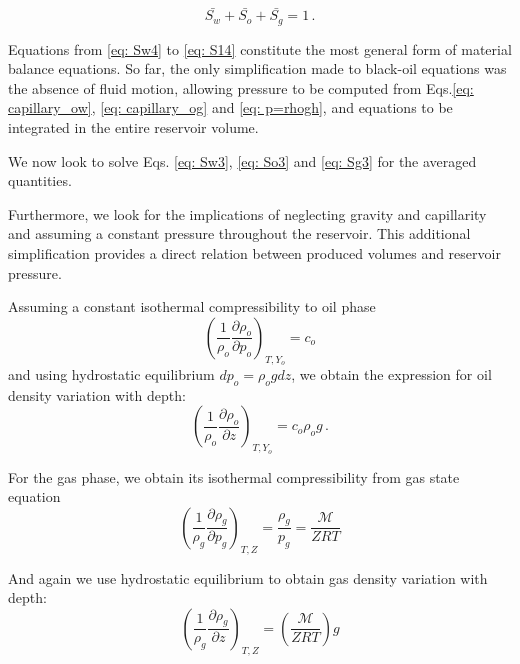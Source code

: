 \documentclass[authoryear,preprint,review,12pt]{elsarticle}
\begin{document}
\begin{equation}\label{eq: S14}
\bar{S_w}+\bar{S_o}+\bar{S_g}=1 \, .
\end{equation}

Equations from \eqref{eq: Sw4} to \eqref{eq: S14} constitute the most general form of material balance equations. So far, the only simplification made to black-oil equations was the absence of fluid motion, allowing pressure to be computed from Eqs.\eqref{eq: capillary_ow}, \eqref{eq: capillary_og} and \eqref{eq: p=rhogh}, and equations to be integrated in the entire reservoir volume.

We now look to solve Eqs. \eqref{eq: Sw3}, \eqref{eq: So3} and \eqref{eq: Sg3} for the averaged quantities. 

Furthermore, we look for the implications of neglecting gravity and capillarity and assuming a constant pressure throughout the reservoir. This additional simplification provides a direct relation between produced volumes and reservoir pressure.

Assuming a constant isothermal compressibility to oil phase
\begin{equation}
\left( \frac{1}{\rho_o}\frac{\partial \rho_o}{\partial p_o} \right)_{T,Y_o} = c_o
\end{equation}
and using hydrostatic equilibrium $dp_o = \rho_o g dz$, we obtain the expression for oil density variation with depth:
\begin{equation}
\left( \frac{1}{\rho_o}\frac{\partial \rho_o}{\partial z} \right)_{T,Y_o} = c_o \rho_o g \, .
\end{equation}

For the gas phase, we obtain its isothermal compressibility from gas state equation
\begin{equation}
\left(\frac{1}{\rho_g}\frac{\partial \rho_g}{\partial p_g}\right)_{T,Z} = \frac{\rho_g}{p_g} = \frac{\mathcal{M}}{ZRT}
\end{equation}

And again we use hydrostatic equilibrium to obtain gas density variation with depth:
\begin{equation}
\left(\frac{1}{\rho_g}\frac{\partial \rho_g}{\partial z}\right)_{T,Z} = \left(\frac{\mathcal{M}}{ Z R T}\right) g
\end{equation}

\end{document}
